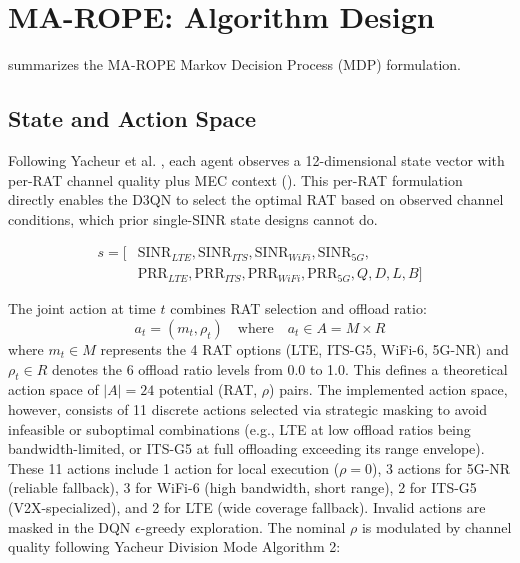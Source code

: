 

\section{MA-ROPE: Algorithm Design}

 summarizes the MA-ROPE Markov Decision Process (MDP) formulation.

\subsection{State and Action Space}

Following Yacheur et al. \cite{yacheur2023}, each agent observes a 12-dimensional state vector with per-RAT channel quality plus MEC context (). This per-RAT formulation directly enables the D3QN to select the optimal RAT based on observed channel conditions, which prior single-SINR state designs cannot do.

\begin{equation}
\label{eq:state}
\begin{split}s = [&\text{SINR}_{LTE}, \text{SINR}_{ITS}, \text{SINR}_{WiFi}, \text{SINR}_{5G}, \\ &\text{PRR}_{LTE}, \text{PRR}_{ITS}, \text{PRR}_{WiFi}, \text{PRR}_{5G}, Q, D, L, B]\end{split}
\end{equation}

The joint action at time $t$ combines RAT selection and offload ratio:
\begin{equation}
\label{eq:action_space}
a_t = (m_t, \rho_t) \quad \text{where} \quad a_t \in A = M \times R
\end{equation}
where $m_t \in M$ represents the 4 RAT options (LTE, ITS-G5, WiFi-6, 5G-NR) and $\rho_t \in R$ denotes the 6 offload ratio levels from 0.0 to 1.0. This defines a theoretical action space of $|A| = 24$ potential (RAT, $\rho$) pairs. The implemented action space, however, consists of 11 discrete actions selected via strategic masking to avoid infeasible or suboptimal combinations (e.g., LTE at low offload ratios being bandwidth-limited, or ITS-G5 at full offloading exceeding its range envelope). These 11 actions include 1 action for local execution ($\rho=0$), 3 actions for 5G-NR (reliable fallback), 3 for WiFi-6 (high bandwidth, short range), 2 for ITS-G5 (V2X-specialized), and 2 for LTE (wide coverage fallback). Invalid actions are masked in the DQN $\epsilon$-greedy exploration. The nominal $\rho$ is modulated by channel quality following Yacheur Division Mode \cite{yacheur2023} Algorithm 2:

